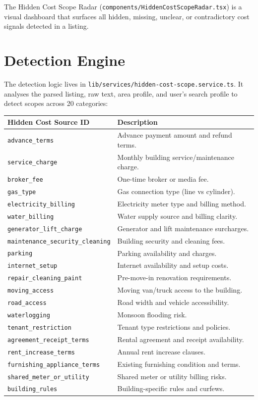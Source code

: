 \documentclass[12pt, a4paper, oneside]{report}
\newcommand{\filepath}[1]{\texttt{\small\color{codeblue}#1}}
\begin{document}
The Hidden Cost Scope Radar (\filepath{components/HiddenCostScopeRadar.tsx}) is a visual dashboard that surfaces all hidden, missing, unclear, or contradictory cost signals detected in a listing.

\section{Detection Engine}

The detection logic lives in \filepath{lib/services/hidden-cost-scope.service.ts}. It analyses the parsed listing, raw text, area profile, and user's search profile to detect scopes across 20 categories:

\begin{longtable}{p{5cm} p{8cm}}
\toprule
\textbf{Hidden Cost Source ID} & \textbf{Description} \\
\midrule
\endhead
\texttt{advance\_terms} & Advance payment amount and refund terms. \\
\texttt{service\_charge} & Monthly building service/maintenance charge. \\
\texttt{broker\_fee} & One-time broker or media fee. \\
\texttt{gas\_type} & Gas connection type (line vs cylinder). \\
\texttt{electricity\_billing} & Electricity meter type and billing method. \\
\texttt{water\_billing} & Water supply source and billing clarity. \\
\texttt{generator\_lift\_charge} & Generator and lift maintenance surcharges. \\
\texttt{maintenance\_security\_cleaning} & Building security and cleaning fees. \\
\texttt{parking} & Parking availability and charges. \\
\texttt{internet\_setup} & Internet availability and setup costs. \\
\texttt{repair\_cleaning\_paint} & Pre-move-in renovation requirements. \\
\texttt{moving\_access} & Moving van/truck access to the building. \\
\texttt{road\_access} & Road width and vehicle accessibility. \\
\texttt{waterlogging} & Monsoon flooding risk. \\
\texttt{tenant\_restriction} & Tenant type restrictions and policies. \\
\texttt{agreement\_receipt\_terms} & Rental agreement and receipt availability. \\
\texttt{rent\_increase\_terms} & Annual rent increase clauses. \\
\texttt{furnishing\_appliance\_terms} & Existing furnishing condition and terms. \\
\texttt{shared\_meter\_or\_utility} & Shared meter or utility billing risks. \\
\texttt{building\_rules} & Building-specific rules and curfews. \\
\bottomrule
\end{longtable}
\end{document}
